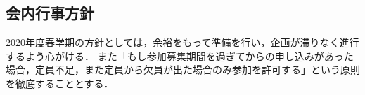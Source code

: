 \subsection*{会内行事方針}

2020年度春学期の方針としては，余裕をもって準備を行い，企画が滞りなく進行するよう心がける．
また「もし参加募集期間を過ぎてからの申し込みがあった場合，定員不足，また定員から欠員が出た場合のみ参加を許可する」という原則を徹底することとする．
